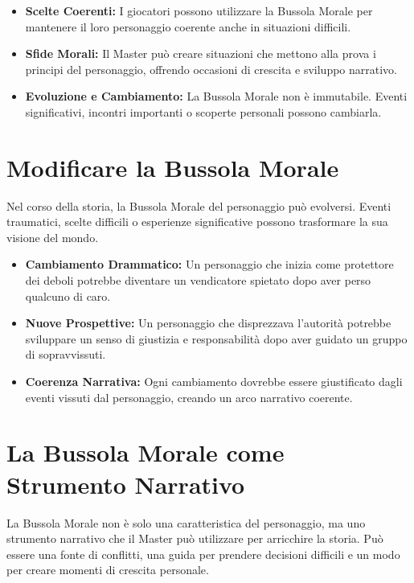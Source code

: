 \documentclass[../manuale_main.tex]{subfiles}
\begin{document}
\begin{itemize}
    \item \textbf{Scelte Coerenti:} I giocatori possono utilizzare la Bussola Morale per mantenere il loro personaggio coerente anche in situazioni difficili.
    \item \textbf{Sfide Morali:} Il Master può creare situazioni che mettono alla prova i principi del personaggio, offrendo occasioni di crescita e sviluppo narrativo.
    \item \textbf{Evoluzione e Cambiamento:} La Bussola Morale non è immutabile. Eventi significativi, incontri importanti o scoperte personali possono cambiarla.
\end{itemize}

\vspace{0.3cm}

\section{Modificare la Bussola Morale}
Nel corso della storia, la Bussola Morale del personaggio può evolversi. Eventi traumatici, scelte difficili o esperienze significative possono trasformare la sua visione del mondo.

\begin{itemize}
    \item \textbf{Cambiamento Drammatico:} Un personaggio che inizia come protettore dei deboli potrebbe diventare un vendicatore spietato dopo aver perso qualcuno di caro.
    \item \textbf{Nuove Prospettive:} Un personaggio che disprezzava l'autorità potrebbe sviluppare un senso di giustizia e responsabilità dopo aver guidato un gruppo di sopravvissuti.
    \item \textbf{Coerenza Narrativa:} Ogni cambiamento dovrebbe essere giustificato dagli eventi vissuti dal personaggio, creando un arco narrativo coerente.
\end{itemize}

\vspace{0.3cm}

\section*{La Bussola Morale come Strumento Narrativo}
La Bussola Morale non è solo una caratteristica del personaggio, ma uno strumento narrativo che il Master può utilizzare per arricchire la storia. Può essere una fonte di conflitti, una guida per prendere decisioni difficili e un modo per creare momenti di crescita personale.
\end{document}
